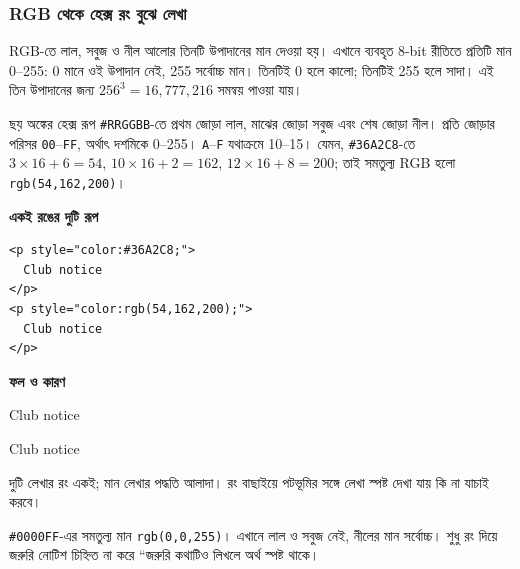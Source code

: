 \subsubsection{RGB থেকে হেক্স রং বুঝে লেখা}
RGB-তে লাল, সবুজ ও নীল আলোর তিনটি উপাদানের মান দেওয়া হয়। এখানে ব্যবহৃত 8-bit রীতিতে প্রতিটি মান 0--255: 0 মানে ওই উপাদান নেই, 255 সর্বোচ্চ মান। তিনটিই 0 হলে কালো; তিনটিই 255 হলে সাদা। এই তিন উপাদানের জন্য $256^3=16{,}777{,}216$ সমন্বয় পাওয়া যায়।

ছয় অঙ্কের হেক্স রূপ \texttt{\#RRGGBB}-তে প্রথম জোড়া লাল, মাঝের জোড়া সবুজ এবং শেষ জোড়া নীল। প্রতি জোড়ার পরিসর \texttt{00}--\texttt{FF}, অর্থাৎ দশমিকে 0--255। \texttt{A}--\texttt{F} যথাক্রমে 10--15। যেমন, \texttt{\#36A2C8}-তে $3\times16+6=54$, $10\times16+2=162$, $12\times16+8=200$; তাই সমতুল্য RGB হলো \texttt{rgb(54,162,200)}।

\par\noindent\begin{minipage}[t]{.50\linewidth}\vspace{0pt}\small
\textbf{\color{chFourTeal}একই রঙের দুটি রূপ}\par
\begin{verbatim}
<p style="color:#36A2C8;">
  Club notice
</p>
<p style="color:rgb(54,162,200);">
  Club notice
</p>
\end{verbatim}
\end{minipage}\hfill
\begin{minipage}[t]{.46\linewidth}\vspace{0pt}\small
\textbf{\color{chFourTeal}ফল ও কারণ}\par
\textcolor[HTML]{36A2C8}{Club notice}\par
\textcolor[HTML]{36A2C8}{Club notice}\par
দুটি লেখার রং একই; মান লেখার পদ্ধতি আলাদা। রং বাছাইয়ে পটভূমির সঙ্গে লেখা স্পষ্ট দেখা যায় কি না যাচাই করবে।
\end{minipage}\par
\texttt{\#0000FF}-এর সমতুল্য মান \texttt{rgb(0,0,255)}। এখানে লাল ও সবুজ নেই, নীলের মান সর্বোচ্চ। শুধু রং দিয়ে জরুরি নোটিশ চিহ্নিত না করে ``জরুরি কথাটিও লিখলে অর্থ স্পষ্ট থাকে।
